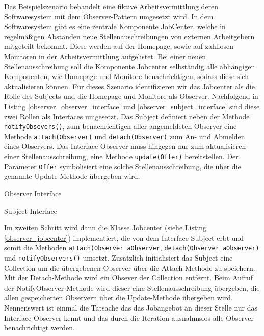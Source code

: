 Das Beispielszenario behandelt eine fiktive Arbeitsvermittlung deren Softwaresystem mit dem  Observer-Pattern umgesetzt wird. In dem Softwaresystem gibt es eine zentrale Komponente JobCenter, welche in regelmäßigen Abständen neue Stellenauschreibungen von externen Arbeitgebern mitgeteilt bekommt. Diese werden auf der Homepage, sowie auf zahllosen Monitoren in der Arbeitsvermittlung aufgelistet. Bei einer neuen Stellenausschreibung soll die Komponente Jobcenter selbständig alle abhängigen Komponenten, wie Homepage und Monitore benachrichtigen, sodass diese sich aktualisieren können.
Für dieses Szenario identifizieren wir das Jobcenter als die Rolle des Subjects und die Homepage und Monitore als Observer. Nachfolgend in Listing \ref{observer_observer_interface} und \ref{observer_subject_interface} sind diese zwei Rollen als Interfaces umgesetzt.
Das Subject definiert neben der Methode \texttt{notifyObsevers()}, zum benachrichtigen aller angemeldeten Observer eine Methode \texttt{attach(Observer)} und \texttt{detach(Observer)} zum An- und Abmelden eines Observers. Das Interface Observer muss hingegen nur zum aktualisieren einer Stellenausschreibung, eine Methode \texttt{update(Offer)} bereitstellen. Der Parameter \texttt{Offer} symbolisiert eine solche Stellenausschreibung, die über die genannte Update-Methode übergeben wird.


\begin{listing}[h!]
   \centering
   \caption{Observer Interface}
    \label{observer_observer_interface}
\end{listing}     
 
\begin{listing}[h!]
   \centering
   \caption{Subject Interface}
    \label{observer_subject_interface}
\end{listing}  
          
  
Im zweiten Schritt wird dann die Klasse Jobcenter (siehe Listing \ref{observer_jobcenter}) implementiert, die von dem Interface Subject erbt und somit die Methoden \texttt{attach(Observer aObserver}, \texttt{detach(Observer aObserver)} und \texttt{notifyObservers()} umsetzt. Zusätzlich initialisiert das Subject eine Collection um die übergebenen Observer über die Attach-Methode zu speichern. Mit der Detach-Methode wird ein Obsever der Collection entfernt. Beim Aufruf der NotifyObserver-Methode wird dieser eine Stellenausschreibung übergeben, die allen gespeicherten Observern über die Update-Methode übergeben wird. 
Nennenswert ist einmal die Tatsache das das Jobangebot an dieser Stelle nur das Interface Observer kennt und das durch die Iteration ausnahmslos alle Observer benachrichtigt werden.

